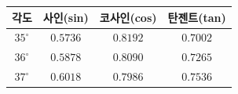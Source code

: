 {\renewcommand{\arraystretch}{1.45}\small
\begin{tabular}{|c|c|c|c|}
\hline
각도 & 사인(sin) & 코사인(cos) & 탄젠트(tan) \\ \hline
$35^\circ$ & $0.5736$ & $0.8192$ & $0.7002$ \\ \hline
$36^\circ$ & $0.5878$ & $0.8090$ & $0.7265$ \\ \hline
$37^\circ$ & $0.6018$ & $0.7986$ & $0.7536$ \\ \hline
\end{tabular}}
